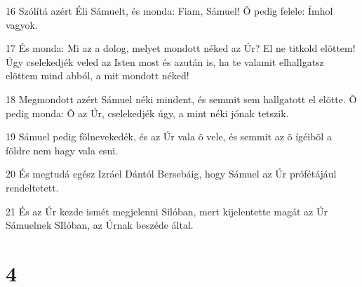 \par 16 Szólítá azért Éli Sámuelt, és monda: Fiam, Sámuel! Õ pedig felele: Ímhol vagyok.
\par 17 És monda: Mi az a dolog, melyet mondott néked az Úr? El ne titkold elõttem! Úgy cselekedjék veled az Isten most és azután is, ha te valamit elhallgatsz elõttem mind abból, a mit mondott néked!
\par 18 Megmondott azért Sámuel néki mindent, és semmit sem hallgatott el elõtte. Õ pedig monda: Õ az Úr, cselekedjék úgy, a mint néki jónak tetszik.
\par 19 Sámuel pedig fölnevekedék, és az Úr vala õ vele, és semmit az õ ígéibõl a földre nem hagy vala esni.
\par 20 És megtudá egész Izráel Dántól Bersebáig, hogy Sámuel az Úr prófétájául rendeltetett.
\par 21 És az Úr kezde ismét megjelenni Silóban, mert kijelentette magát az Úr Sámuelnek SIlóban, az Úrnak beszéde által.

\chapter{4}

